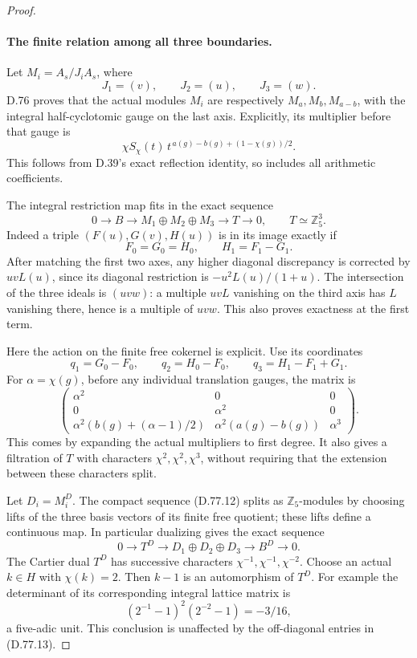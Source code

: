 \begin{proof}
\paragraph{The finite relation among all three boundaries.}
Let \(M_i=A_s/J_iA_s\), where
\[
                  J_1=(v),\qquad J_2=(u),\qquad J_3=(w).
\]
D.76 proves that the actual modules \(M_i\) are respectively
\(M_a,M_b,M_{a-b}\), with the integral half-cyclotomic gauge on
the last axis. Explicitly, its multiplier before that gauge is
\[
 \chi S_\chi(t)\,t^{\,a(g)-b(g)+(1-\chi(g))/2}.
                                                               \tag{D.77.11}
\]
This follows from D.39's exact reflection identity, so includes
all arithmetic coefficients.

The integral restriction map fits in the exact sequence
\[
 0\longrightarrow B\longrightarrow
        M_1\oplus M_2\oplus M_3
          \longrightarrow T\longrightarrow0,
 \qquad T\simeq\mathbb Z_5^3.                            \tag{D.77.12}
\]
Indeed a triple \((F(u),G(v),H(u))\) is in its image exactly if
\[
 F_0=G_0=H_0,\qquad H_1=F_1-G_1.
\]
After matching the first two axes, any higher diagonal
discrepancy is corrected by \(uvL(u)\), since its diagonal
restriction is \(-u^2L(u)/(1+u)\). The intersection of the
three ideals is \((uvw)\): a multiple \(uvL\) vanishing on the
third axis has \(L\) vanishing there, hence is a multiple of \(uvw\).
This also proves exactness at the first term.

Here the action on the finite free cokernel is explicit. Use its
coordinates
\[
 q_1=G_0-F_0,\qquad q_2=H_0-F_0,\qquad q_3=H_1-F_1+G_1.
\]
For \(\alpha=\chi(g)\), before any individual translation gauges,
the matrix is
\[
 \begin{pmatrix}
 \alpha^2&0&0\\
 0&\alpha^2&0\\
 \alpha^2(b(g)+(\alpha-1)/2)&
 \alpha^2(a(g)-b(g))&\alpha^3
 \end{pmatrix}.                                        \tag{D.77.13}
\]
This comes by expanding the actual multipliers to first degree.
It also gives a filtration of \(T\) with characters
\(\chi^2,\chi^2,\chi^3\), without requiring that the extension
between these characters split.

Let \(D_i=M_i^D\). The compact sequence (D.77.12) splits as
\(\mathbb Z_5\)-modules by choosing lifts of the three basis vectors
of its finite free quotient; these lifts define a continuous map.
In particular dualizing gives the exact sequence
\[
 0\longrightarrow T^D\longrightarrow
       D_1\oplus D_2\oplus D_3
          \longrightarrow B^D\longrightarrow0.         \tag{D.77.14}
\]
The Cartier dual \(T^D\) has successive characters
\(\chi^{-1},\chi^{-1},\chi^{-2}\).
Choose an actual \(k\in H\) with \(\chi(k)=2\). Then \(k-1\) is
an automorphism of \(T^D\). For example the determinant of its
corresponding integral lattice matrix is
\[
             (2^{-1}-1)^2(2^{-2}-1)=-3/16,
                                                               \tag{D.77.15}
\]
a five-adic unit. This conclusion is unaffected by the off-diagonal
entries in (D.77.13).


\end{proof}

